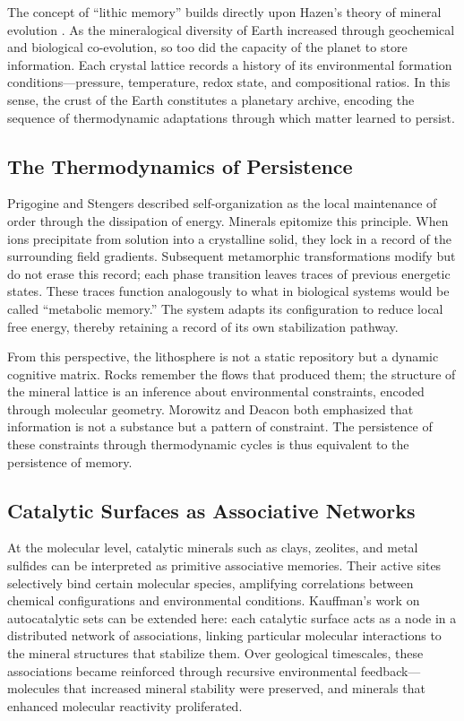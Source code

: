 \documentclass[11pt,a4paper]{article}
\begin{document}
The concept of “lithic memory” builds directly upon Hazen’s theory of mineral evolution \citep{Hazen2008MineralEvolution, Hazen2010EvolutionMinerals}.  As the mineralogical diversity of Earth increased through geochemical and biological co-evolution, so too did the capacity of the planet to store information.  Each crystal lattice records a history of its environmental formation conditions—pressure, temperature, redox state, and compositional ratios.  In this sense, the crust of the Earth constitutes a planetary archive, encoding the sequence of thermodynamic adaptations through which matter learned to persist.

\subsection{The Thermodynamics of Persistence}

Prigogine and Stengers \citep{Prigogine1977SelfOrganizationNonequilibrium} described self-organization as the local maintenance of order through the dissipation of energy.  Minerals epitomize this principle.  When ions precipitate from solution into a crystalline solid, they lock in a record of the surrounding field gradients.  Subsequent metamorphic transformations modify but do not erase this record; each phase transition leaves traces of previous energetic states.  These traces function analogously to what in biological systems would be called “metabolic memory.”  The system adapts its configuration to reduce local free energy, thereby retaining a record of its own stabilization pathway.

From this perspective, the lithosphere is not a static repository but a dynamic cognitive matrix.  Rocks remember the flows that produced them; the structure of the mineral lattice is an inference about environmental constraints, encoded through molecular geometry.  Morowitz \citep{Morowitz1968EnergyFlowBiology} and Deacon \citep{Deacon2011IncompleteNature} both emphasized that information is not a substance but a pattern of constraint.  The persistence of these constraints through thermodynamic cycles is thus equivalent to the persistence of memory.

\subsection{Catalytic Surfaces as Associative Networks}

At the molecular level, catalytic minerals such as clays, zeolites, and metal sulfides can be interpreted as primitive associative memories.  Their active sites selectively bind certain molecular species, amplifying correlations between chemical configurations and environmental conditions.  Kauffman’s work on autocatalytic sets \citep{Kauffman1993OriginsOfOrder} can be extended here: each catalytic surface acts as a node in a distributed network of associations, linking particular molecular interactions to the mineral structures that stabilize them.  Over geological timescales, these associations became reinforced through recursive environmental feedback—molecules that increased mineral stability were preserved, and minerals that enhanced molecular reactivity proliferated.  
\end{document}
